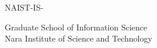 \renewcommand\thepage{Title1}
\thispagestyle{empty}
 {\raggedleft
 \normalsize NAIST-IS-\studentnumber \\
 }
 \vspace*{9truemm}
 \begin{center}
  \Large\bfseries\edoctitle
 \end{center}
 \vspace*{27truemm}
 \begin{center}
  \Large\bfseries\etitle
 \end{center}
 \vspace*{18truemm}
 \begin{center}
  \Large\eauthor
 \end{center}
 \vspace*{45truemm}
 \begin{center}
  \edate
 \end{center}
 \vspace*{4truemm}
 \begin{center}
  Graduate School of Information Science \\
  Nara Institute of Science and Technology
 \end{center}
 \vspace*{\fill}